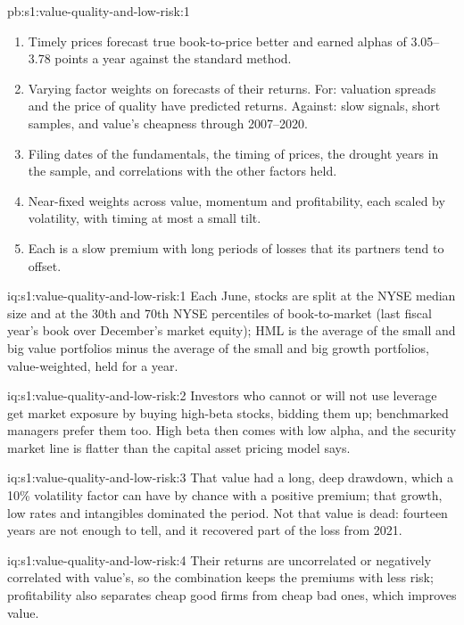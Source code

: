 \begin{solution}{pb:s1:value-quality-and-low-risk:1}
\begin{enumerate}
\item Timely prices forecast true book-to-price better and earned alphas of 3.05--3.78 points a year against the standard method.
\item Varying factor weights on forecasts of their returns. For: valuation spreads and the price of quality have predicted returns. Against: slow signals,
short samples, and value's cheapness through 2007--2020.
\item Filing dates of the fundamentals, the timing of prices, the drought years in the sample, and correlations with the other factors held.
\item Near-fixed weights across value, momentum and profitability, each scaled by volatility, with timing at most a small tilt.
\item Each is a slow premium with long periods of losses that its partners tend to offset.
\end{enumerate}
\end{solution}

\begin{solution}{iq:s1:value-quality-and-low-risk:1}
Each June, stocks are split at the NYSE median size and at the 30th and 70th NYSE percentiles of book-to-market (last fiscal year's book over December's
market equity); HML is the average of the small and big value portfolios minus the average of the small and big growth portfolios, value-weighted, held for a
year.
\end{solution}

\begin{solution}{iq:s1:value-quality-and-low-risk:2}
Investors who cannot or will not use leverage get market exposure by buying high-beta stocks, bidding them up; benchmarked managers prefer them too. High beta
then comes with low alpha, and the security market line is flatter than the capital asset pricing model says.
\end{solution}

\begin{solution}{iq:s1:value-quality-and-low-risk:3}
That value had a long, deep drawdown, which a 10\% volatility factor can have by chance with a positive premium; that growth, low rates and intangibles
dominated the period. Not that value is dead: fourteen years are not enough to tell, and it recovered part of the loss from 2021.
\end{solution}

\begin{solution}{iq:s1:value-quality-and-low-risk:4}
Their returns are uncorrelated or negatively correlated with value's, so the combination keeps the premiums with less risk; profitability also separates cheap
good firms from cheap bad ones, which improves value.
\end{solution}

